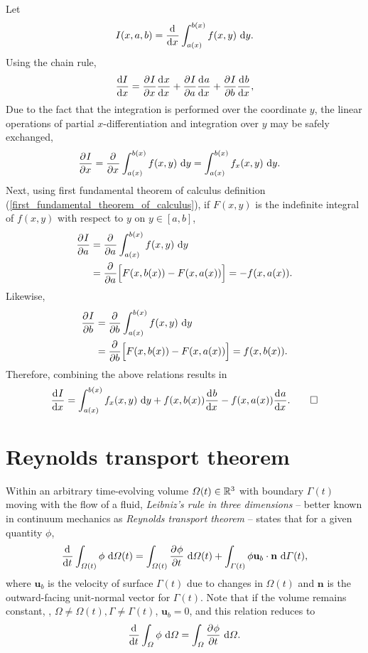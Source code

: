 Let
$$I(x,a,b) = \frac{\mathrm{d}^{} }{\mathrm{d} x^{} } \int_{a(x)}^{b(x)} f(x,y) \ \mathrm{d}y.$$
Using the chain rule,
$$\frac{\mathrm{d}I}{\mathrm{d}x} = \frac{\partial^{} I}{\partial x^{} } \frac{\mathrm{d}^{} x}{\mathrm{d} x^{} } + \frac{\partial^{} I}{\partial a^{} } \frac{\mathrm{d}^{} a}{\mathrm{d} x^{} } + \frac{\partial^{} I}{\partial b^{} } \frac{\mathrm{d}^{} b}{\mathrm{d} x^{} },$$
Due to the fact that the integration is performed over the coordinate $y$, the linear operations of partial $x$-differentiation and integration over $y$ may be safely exchanged,
\begin{align*}
  \frac{\partial^{} I}{\partial x^{} } &= \frac{\partial^{} }{\partial x^{} } \int_{a(x)}^{b(x)} f(x,y) \ \mathrm{d}y = \int_{a(x)}^{b(x)} f_x(x,y) \ \mathrm{d}y.
\end{align*}
Next, using first fundamental theorem of calculus definition (\ref{first_fundamental_theorem_of_calculus}), if $F(x,y)$ is the indefinite integral of $f(x,y)$ with respect to $y$ on $y \in [a,b]$,
\begin{align*}
  \frac{\partial^{} I}{\partial a^{} } &= \frac{\partial^{} }{\partial a^{} } \int_{a(x)}^{b(x)} f(x,y) \ \mathrm{d}y \\
                &= \frac{\partial^{} }{\partial a^{} } \Big[ F(x,b(x)) - F(x,a(x)) \Big] = - f(x,a(x)).
\end{align*}
Likewise,
\begin{align*}
  \frac{\partial^{} I}{\partial b^{} } &= \frac{\partial^{} }{\partial b^{} } \int_{a(x)}^{b(x)} f(x,y) \ \mathrm{d}y \\
                &= \frac{\partial^{} }{\partial b^{} } \Big[ F(x,b(x)) - F(x,a(x)) \Big] = f(x,b(x)).
\end{align*}
Therefore, combining the above relations results in
$$\frac{\mathrm{d}^{} I}{\mathrm{d} x^{} } = \int_{a(x)}^{b(x)} f_x(x,y) \ \mathrm{d}y + f(x,b(x))\frac{\mathrm{d}^{} b}{\mathrm{d} x^{} } - f(x,a(x))\frac{\mathrm{d}^{} a}{\mathrm{d} x^{} }. \qed$$

\section{Reynolds transport theorem} \label{ssn_reynolds_transport_theorem}

Within an arbitrary time-evolving volume $\varOmega(t) \in \mathbb{R}^3$ with boundary $\Gamma(t)$ moving with the flow of a fluid, \emph{Leibniz's rule in three dimensions} -- better known in continuum mechanics as  \emph{Reynolds transport theorem} \citep{reynolds_1903} -- states that for a given quantity $\phi$,
\begin{align}
  \label{reynolds_transport_theorem}
  \frac{\mathrm{d}^{} }{\mathrm{d} t^{} } \int_{\varOmega(t)} \phi \ \mathrm{d}\varOmega(t) = \int_{\varOmega(t)} \frac{\partial^{} \phi}{\partial t^{} } \ \mathrm{d}\varOmega(t) + \int_{\varGamma(t)} \phi \mathbf{u}_b \cdot \mathbf{n} \ \mathrm{d}\varGamma(t),
\end{align}
where $\mathbf{u}_b$ is the velocity of surface $\Gamma(t)$ due to changes in $\Omega(t)$ and $\mathbf{n}$ is the outward-facing unit-normal vector for $\Gamma(t)$.
Note that if the volume remains constant, \ie, $\Omega \neq \Omega(t), \Gamma \neq \Gamma(t)$, $\mathbf{u}_b = 0$, and this relation reduces to
\begin{align}
  \label{constant_volume_reynolds}
  \frac{\mathrm{d}^{} }{\mathrm{d} t^{} } \int_{\varOmega} \phi \ \mathrm{d}\varOmega = \int_{\varOmega} \frac{\partial^{} \phi}{\partial t^{} } \ \mathrm{d}\varOmega.
\end{align}

